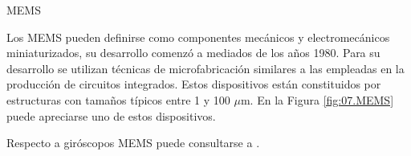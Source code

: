 \begin{myboxAzul}{\ac{MEMS}}
 \begin{minipage}[c]{0.60\linewidth}
    Los \ac{MEMS} pueden definirse como componentes mecánicos y
    electromecánicos miniaturizados, su desarrollo comenz\'o a
    mediados de los a\~nos 1980. Para su desarrollo se utilizan
    técnicas de microfabricación similares a las empleadas en la
    producción de circuitos integrados. Estos dispositivos están
    constituidos por estructuras con tamaños típicos entre 1 y 100
    $\mu$m. En la Figura \ref{fig:07.MEMS} puede apreciarse uno de 
    estos dispositivos.

Respecto a giróscopos MEMS puede consultarse a \cite{MEMSgiroscopos}.



\end{minipage}
\end{myboxAzul}
